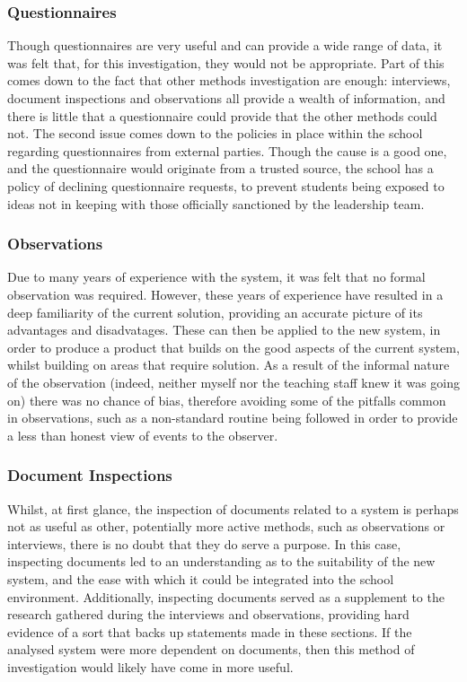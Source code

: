 \subsubsection{Questionnaires} %
\label{ssub:questionnaires}
Though questionnaires are very useful and can provide a wide range of data, it was felt that, for this investigation, they would not be appropriate. Part of this comes down to the fact that other methods investigation are enough: interviews, document inspections and observations all provide a wealth of information, and there is little that a questionnaire could provide that the other methods could not. The second issue comes down to the policies in place within the school regarding questionnaires from external parties. Though the cause is a good one, and the questionnaire would originate from a trusted source, the school has a policy of declining questionnaire requests, to prevent students being exposed to ideas not in keeping with those officially sanctioned by the leadership team.

\subsubsection{Observations} %
\label{ssub:observations}
Due to many years of experience with the system, it was felt that no formal observation was required. However, these years of experience have resulted in a deep familiarity of the current solution, providing an accurate picture of its advantages and disadvatages. These can then be applied to the new system, in order to produce a product that builds on the good aspects of the current system, whilst building on areas that require solution. As a result of the informal nature of the observation (indeed, neither myself nor the teaching staff knew it was going on) there was no chance of bias, therefore avoiding some of the pitfalls common in observations, such as a non-standard routine being followed in order to provide a less than honest view of events to the observer.

\subsubsection{Document Inspections} %
\label{ssub:document_inspections}
Whilst, at first glance, the inspection of documents related to a system is perhaps not as useful as other, potentially more active methods, such as observations or interviews, there is no doubt that they do serve a purpose. In this case, inspecting documents led to an understanding as to the suitability of the new system, and the ease with which it could be integrated into the school environment. Additionally, inspecting documents served as a supplement to the research gathered during the interviews and observations, providing hard evidence of a sort that backs up statements made in these sections. If the analysed system were more dependent on documents, then this method of investigation would likely have come in more useful.

